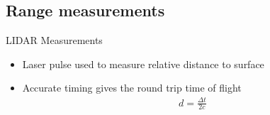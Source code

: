 \documentclass[11pt,professionalfonts,aspectratio=169]{beamer}
\begin{document}
\subsection[LIDAR]{Range measurements}
\begin{frame}{LIDAR Measurements }
    \begin{itemize}
        \item<1-> Laser pulse used to measure relative distance to surface
        \item<2-> Accurate timing gives the round trip time of flight
            \begin{align*}
                d = \frac{\Delta t}{2 c}
            \end{align*}
    \end{itemize}
    
\end{frame}
\end{document}
